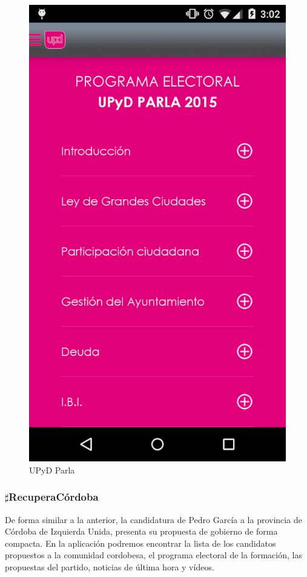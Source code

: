 	\begin{figure}[H]
      \centering
	\includegraphics[keepaspectratio, scale=0.35]{Media/Captures/UPyDParla.png}
      \caption{UPyD Parla}
      \label{fig:upydparla}
    \end{figure}

	\subsubsection{$\sharp$RecuperaCórdoba}\label{sssec:RecuperaCordoba}
De forma similar a la anterior, la candidatura de Pedro García a la provincia de Córdoba de Izquierda Unida, presenta su propuesta de gobierno de forma compacta. En la aplicación podremos encontrar la lista de los candidatos propuestos a la comunidad cordobesa, el programa electoral de la formación, las propuestas del partido, noticias de última hora y vídeos.

